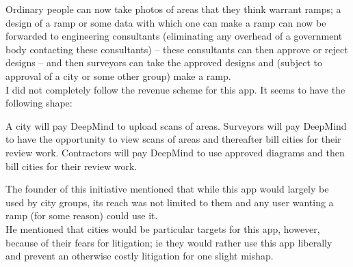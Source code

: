 \documentclass[a4paper]{article}
\begin{document}
Ordinary people can now take photos of areas that they think warrant ramps; a design of a ramp or some data with which one can make a ramp can now be forwarded to engineering consultants (eliminating any overhead of a government body contacting these consultants) -- these consultants can then approve or reject designs -- and then surveyors can take the approved designs and (subject to approval of a city or some other group) make a ramp. \\
 
I did not completely follow the revenue scheme for this app. It seems to have the following shape: \\

\begin{outline}
    \1 A city will pay DeepMind to upload scans of areas.
    \1 Surveyors will pay DeepMind to have the opportunity to view scans of areas and thereafter bill cities for their review work.
    \1 Contractors will pay DeepMind to use approved diagrams and then bill cities for their review work.
\end{outline}

The founder of this initiative mentioned that while this app would largely be used by city groups, its reach was not limited to them and any user wanting a ramp (for some reason) could use it. \\

He mentioned that cities would be particular targets for this app, however, because of their fears for litigation; ie they would rather use this app liberally and prevent an otherwise costly litigation for one slight mishap. \\


\end{document}

